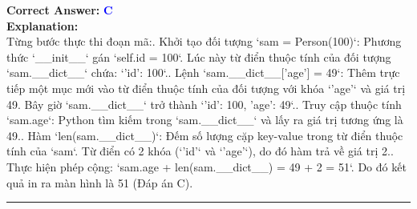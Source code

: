 \documentclass[11pt,a4paper]{article}
\begin{document}
\begin{minipage}{\textwidth}
\noindent \textbf{Correct Answer:} \textcolor{blue}{\textbf{C}} \\[4pt]
\noindent \textbf{Explanation:}\\
Từng bước thực thi đoạn mã:. Khởi tạo đối tượng `sam = Person(100)`: Phương thức `__init__` gán `self.id = 100`. Lúc này từ điển thuộc tính của đối tượng `sam.__dict__` chứa: `{'id': 100}`.. Lệnh `sam.__dict__['age'] = 49`: Thêm trực tiếp một mục mới vào từ điển thuộc tính của đối tượng với khóa `'age'` và giá trị 49. Bây giờ `sam.__dict__` trở thành `{'id': 100, 'age': 49}`.. Truy cập thuộc tính `sam.age`: Python tìm kiếm trong `sam.__dict__` và lấy ra giá trị tương ứng là 49.. Hàm `len(sam.__dict__)`: Đếm số lượng cặp key-value trong từ điển thuộc tính của `sam`. Từ điển có 2 khóa (`'id'` và `'age'`), do đó hàm trả về giá trị 2.. Thực hiện phép cộng: `sam.age + len(sam.__dict__) = 49 + 2 = 51`.\newline
Do đó kết quả in ra màn hình là 51 (Đáp án C).
\end{minipage}
\vspace{0.8cm}
\hrule
\vspace{0.5cm}
\end{document}
